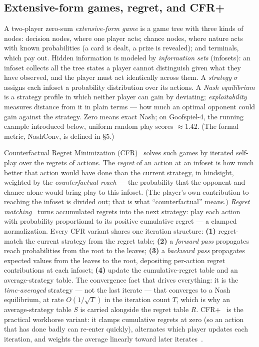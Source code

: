 \documentclass[11pt]{article}
\begin{document}
\subsection{Extensive-form games, regret, and CFR+}

A two-player zero-sum \emph{extensive-form game} is a game tree with three kinds of
nodes: decision nodes, where one player acts; chance nodes, where nature acts with known
probabilities (a card is dealt, a prize is revealed); and terminals, which pay out.
Hidden information is modeled by \emph{information sets} (infosets): an infoset collects
all the tree states a player cannot distinguish given what they have observed, and the
player must act identically across them. A \emph{strategy} $\sigma$ assigns each infoset
a probability distribution over its actions. A \emph{Nash equilibrium} is a strategy
profile in which neither player can gain by deviating; \emph{exploitability} measures
distance from it in plain terms --- how much an optimal opponent could gain against the
strategy. Zero means exact Nash; on Goofspiel-4, the running example introduced below,
uniform random play scores $\approx$1.42. (The formal metric, NashConv, is defined in
\S5.)

Counterfactual Regret Minimization (CFR)~\citep{Zinkevich2007} solves such games by
iterated self-play over the regrets of actions. The \emph{regret} of an action at an
infoset is how much better that action would have done than the current strategy, in
hindsight, weighted by the \emph{counterfactual reach} --- the probability that the
opponent and chance alone would bring play to this infoset. (The player's own
contribution to reaching the infoset is divided out; that is what ``counterfactual''
means.) \emph{Regret matching}~\citep{HartMasColell2000} turns accumulated regrets into
the next strategy: play each action with probability proportional to its positive
cumulative regret --- a clamped normalization. Every CFR variant shares one iteration
structure: \textbf{(1)} regret-match the current strategy from the regret table;
\textbf{(2)} a \emph{forward pass} propagates reach probabilities from the root to the
leaves; \textbf{(3)} a \emph{backward pass} propagates expected values from the leaves
to the root, depositing per-action regret contributions at each infoset; \textbf{(4)}
update the cumulative-regret table and an average-strategy table. The convergence fact
that drives everything: it is the \emph{time-averaged} strategy --- not the last iterate
--- that converges to a Nash equilibrium, at rate $O(1/\sqrt{T})$ in the iteration count
$T$, which is why an average-strategy table $S$ is carried alongside the regret table
$R$. CFR+~\citep{Tammelin2014} is the practical workhorse variant: it clamps cumulative
regrets at zero (so an action that has done badly can re-enter quickly), alternates
which player updates each iteration, and weights the average linearly toward later
iterates~\citep{Tammelin2015,BurchMoravcikSchmid2019}.
\end{document}
